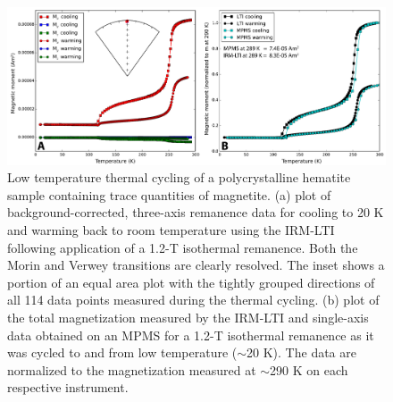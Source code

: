 \documentclass[draft,gc]{AGUTeX}
\begin{document}
\begin{figure}
\noindent\includegraphics[width=\textwidth]{HemMag1.pdf}
\caption{Low temperature thermal cycling of a polycrystalline hematite sample containing trace quantities of magnetite. (a) plot of background-corrected, three-axis remanence data for cooling to 20 K and warming back to room temperature using the IRM-LTI following application of a 1.2-T isothermal remanence. Both the Morin and Verwey transitions are clearly resolved. The inset shows a portion of an equal area plot with the tightly grouped directions of all 114 data points measured during the thermal cycling. (b) plot of the total magnetization measured by the IRM-LTI and single-axis data obtained on an MPMS for a 1.2-T isothermal remanence as it was cycled to and from low temperature ($\sim$20 K). The data are normalized to the magnetization measured at $\sim$290 K on each respective instrument.}
\label{fig:naco}
\end{figure}
\end{document}
